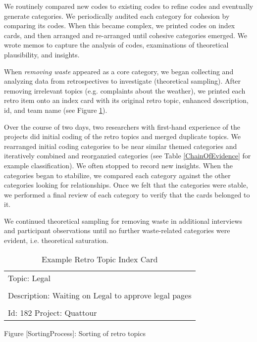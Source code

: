 We routinely compared new codes to existing codes to refine codes and eventually generate categories. We periodically audited each category for cohesion by comparing its codes. When this became complex, we printed codes on index cards, and then arranged and re-arranged until cohesive categories emerged. We wrote memos to capture the analysis of codes, examinations of theoretical plausibility, and insights.

When \textit{removing waste} appeared as a core category, we began collecting and analyzing data from retrospectives to investigate (theoretical sampling). After removing irrelevant topics (e.g. complaints about the weather), we printed each retro item onto an index card with its original retro topic, enhanced description, id, and team name (see Figure \ref{exampleRetroTopicl}).

Over the course of two days, two researchers with first-hand experience of the projects did initial coding of the retro topics and merged duplicate topics. We rearranged initial coding categories to be near similar themed categories and iteratively combined and reorganzied categories (see Table \ref{ChainOfEvidence} for example classification). We often stopped to record new insights. When the categories began to stabilize, we compared each category against the other categories looking for relationships. Once we felt that the categories were stable, we performed a final review of each category to verify that the cards belonged to it. 

We continued theoretical sampling for removing waste in additional interviews and participant observations until no further waste-related categories were evident, i.e. theoretical saturation. 


\begin{table}[t]
\renewcommand{\arraystretch}{1.5}
\centering
\caption{Example Retro Topic Index Card }
\label{exampleRetroTopicl}
\begin{tabular}{|l|}
\hline
Topic: Legal \\ \\ Description: Waiting on Legal to approve legal pages \\ \\ Id: 182 Project: Quattour\\ \hline
\end{tabular}
\end{table}


Figure [SortingProcess]: Sorting of retro topics






